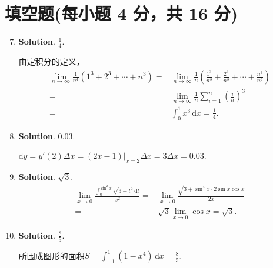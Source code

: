 \documentclass[../Main.tex]{subfiles}
\begin{document}
\section{填空题(每小题 4 分，共 16 分)}
\begin{enumerate}
    \setcounter{enumi}{6}
    \item \textbf{Solution}. $\frac{1}{4}$.

          由定积分的定义，
          \[
              \begin{aligned}
                  \lim_{n\to\infty}\frac{1}{n^4}\left(1^{3}+2^{3}+\cdots+n^{3}\right) = & \lim_{n\to\infty}\frac{1}{n}\left(\frac{1^3}{n^3}+\frac{2^3}{n^3}+\cdots+\frac{n^3}{n^3}\right) \\
                  =                                                                     & \lim_{n\to\infty}\frac{1}{n}\sum_{i=1}^{n}\left(\frac{i}{n}\right)^{3}                          \\
                  =                                                                     & \int_{0}^{1}x^{3}\,\mathrm{d}x = \frac{1}{4}.
              \end{aligned}
          \]

    \item \textbf{Solution}. $0.03$.

          $\mathrm{d}y=y'(2)\Delta x = (2x-1)\bigg|_{x=2}\Delta x=3\Delta x=0.03$.

    \item \textbf{Solution}. $\sqrt{3}$.
          \[
              \begin{aligned}
                  \lim_{x\to0}\frac{\displaystyle\int_{0}^{\sin^2 x}\sqrt{3+t^2}\,\mathrm{d}t}{x^2}= & \lim_{x\to0}\frac{\sqrt{3+\sin ^4 x}\cdot 2\sin x\cos x}{2x} \\
                  =                                                                                  & \sqrt{3}\lim_{x\to0}\cos x = \sqrt{3}.
              \end{aligned}
          \]

    \item \textbf{Solution}. $\frac{8}{5}$.

          所围成图形的面积$S=\int_{-1}^{1}\left(1-x^{4}\right)\,\mathrm{d}x = \frac{8}{5}$.
\end{enumerate}
\end{document}
